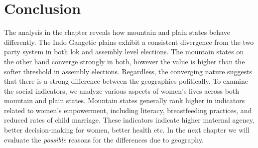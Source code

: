 \section{Conclusion}
The analysis in the chapter reveals how mountain and plain states behave differently. The Indo Gangetic plains exhibit a consistent divergence from the two party system in both lok and assembly level elections. The mountain states on the other hand converge strongly in both, however the value is higher than the softer threshold in assembly elections. Regardless, the converging nature suggests that there is a strong difference between the geographies politically. To examine the social indicators, we analyze various aspects of women's lives across both mountain and plain states. Mountain states generally rank higher in indicators related to women's empowerment, including literacy, breastfeeding practices, and reduced rates of child marriage. These indicators indicate higher maternal agency, better decision-making for women, better health etc. In the next chapter we will evaluate the \textit{possible} reasons for the differences due to geography.